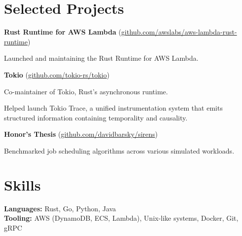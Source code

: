 \documentclass[10pt, a4paper]{article}
\renewenvironment{itemize}[1]{\begin{compactitem}#1}{\end{compactitem}}
\begin{document}
\section*{\textbf{Selected Projects}}


\textbf{Rust Runtime for AWS Lambda} (\href{https://github.com/awslabs/aws-lambda-rust-runtime}{github.com/awslabs/aws-lambda-rust-runtime})
\begin{itemize}
    \item Launched and maintaining the Rust Runtime for AWS Lambda.
\end{itemize}

\textbf{Tokio} (\href{https://github.com/tokio-rs/tokio}{github.com/tokio-rs/tokio})
\begin{itemize}
    \item Co-maintainer of Tokio, Rust's asynchronous runtime.
    \item Helped launch Tokio Trace, a unified instrumentation system that emits structured information containing temporality and causality.
\end{itemize}

\textbf{Honor's Thesis} (\href{https://github.com/davidbarsky/sirens}{github.com/davidbarsky/sirens})
\begin{itemize}
    \item Benchmarked job scheduling algorithms across various simulated workloads.
\end{itemize}

\section*{\textbf{Skills}}
\textbf{Languages:} Rust, Go, Python, Java \\
\textbf{Tooling:} AWS (DynamoDB, ECS, Lambda), Unix-like systems, Docker, Git, gRPC
\end{document}
